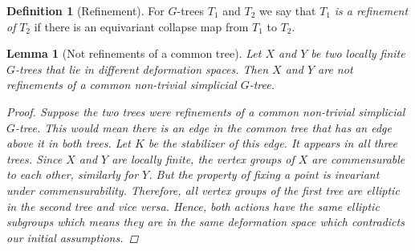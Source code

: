 \documentclass[12pt,parskip=full]{report}
\theoremstyle{plain}
\newtheorem{lem}[thm]{Lemma}
\theoremstyle{definition}
\newtheorem{dfn}[thm]{Definition}
\begin{document}
\begin{dfn}
    [Refinement]
    For \(G\)-trees \(T_1\) and \(T_2\) we say that \(T_1\) \emph{is a refinement of} \(T_2\) if there is an equivariant collapse map from \(T_1\) to \(T_2\).
\end{dfn}

\begin{lem}
    [Not refinements of a common tree]
    \label{lem:nocommonrefinement} 
    Let \(X\) and \(Y\) be two locally finite \(G\)-trees that lie in different deformation spaces. Then $X$ and $Y$ are not refinements of a common non-trivial simplicial $G$-tree.
    \begin{proof}
        Suppose the two trees were refinements of a common non-trivial simplicial $G$-tree. This would mean there is an edge in the common tree that has an edge above it in both trees. Let \(K\) be the stabilizer of this edge. It appears in all three trees. Since $X$ and $Y$ are locally finite, the vertex groups of $X$ are commensurable to each other, similarly for $Y$. But the property of fixing a point is invariant under commensurability. Therefore, all vertex groups of the first tree are elliptic in the second tree and vice versa. Hence, both actions have the same elliptic subgroups which means they are in the same deformation space which contradicts our initial assumptions.
    \end{proof}
\end{lem}



\end{document}
